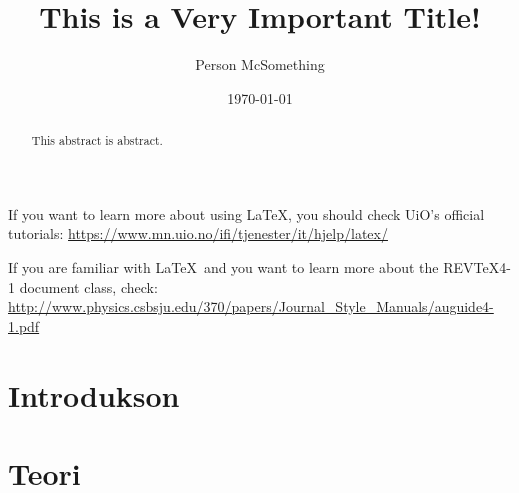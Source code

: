 \documentclass[reprint,english,notitlepage]{revtex4-2}  %
\begin{document}
\title{This is a Very Important Title!}   %
\author{Person McSomething}               %
\date{\today}                             %
\noaffiliation                            %
\begin{abstract}                          %
This abstract is abstract.                %
\end{abstract}                            %
\maketitle                                %

If you want to learn more about using \LaTeX, you should check UiO's official tutorials:
\url{https://www.mn.uio.no/ifi/tjenester/it/hjelp/latex/}

If you are familiar with \LaTeX\ and you want to learn more about the REVTeX4-1 document class, check:
\url{http://www.physics.csbsju.edu/370/papers/Journal_Style_Manuals/auguide4-1.pdf}


\section{Introdukson}

\section{Teori}
\end{document}

